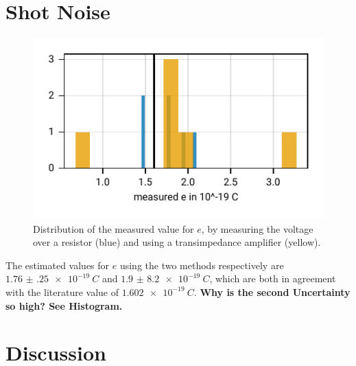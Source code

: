 \documentclass[
    parskip=half, 
    twoside=false,
    twocolumn=true,
    fontsize=11pt,
]{scrarticle}
\begin{document}
\section{Shot Noise}
\begin{figure}[h!]
    \centering
    \includegraphics{figures/03 shot noise.pdf}
    \caption{
        Distribution of the measured value for $e$, by measuring the voltage over a resistor (blue) and using a transimpedance amplifier (yellow).
    }
    \label{fig:shot noise}
\end{figure}
The estimated values for $e$ using the two methods respectively are $\SI{1.76(25)e-19}{C}$ and $\SI{1.9(82)e-19}{C}$, which are both in agreement with the literature value of $\SI{1.602e-19}{C}$.
\textbf{Why is the second Uncertainty so high? See Histogram.}

\pagebreak
\section{Discussion}
\end{document}
